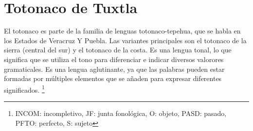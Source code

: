\section*{Totonaco de Tuxtla}

\noindent  El totonaco es parte de la familia de lenguas totonaco-tepehua, que se habla en los Estados de Veracruz Y Puebla. Las variantes principales son el totonaco de la sierra (central del sur) y el totonaco de la costa. Es una lengua tonal, lo que significa que se utiliza el tono para diferenciar e indicar diversos valorores gramaticales. Es una lengua aglutinante, ya que las palabras pueden estar formadas por múltiples elementos que se añaden para expresar diferentes significados.
\footnote{INCOM: incompletivo, JF: junta fonológica, O: objeto, PASD: pasado, PFTO: perfecto, S: sujeto}
\vspace{0.5cm}

